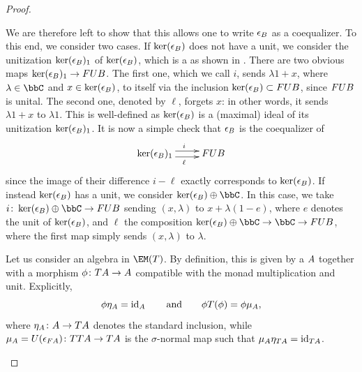 \begin{proof}
\begin{description}
		      We are therefore left to show that this allows one to write $\epsilon_{{B}}$ as a coequalizer. To this end, we consider two cases. If $\ker(\epsilon_{{B}})$ does not have a unit, we consider the unitization $\ker(\epsilon_{{B}})_1$ of $\ker(\epsilon_{{B}})$, which is a \cstars{} as shown in \cite[Proposition 2.2.10]{saito15monotone}.
		      There are two obvious maps $\ker(\epsilon_{{B}})_1 \to FU{B}$.
		      The first one, which we call $i$, sends $\lambda 1+x$, where $\lambda \in \bbC$ and $x\in \ker(\epsilon_{{B}})$, to itself via the inclusion $\ker(\epsilon_{{B}}) \subset FU{B} $, since $FU{B}$ is unital. The second one, denoted by $\ell$, forgets $x$: in other words, it sends $\lambda 1 +x$ to $\lambda 1$. This is well-defined as $\ker(\epsilon_{{B}})$ is a (maximal) ideal of its unitization $\ker(\epsilon_{{B}})_1$.
		      It is now a simple check that $\epsilon_{{B}}$ is the coequalizer of
		      \[
			      \xymatrix{
				      \ker(\epsilon_{\B})_1
				      \ar@<.7ex>[r]^{i}
				      \ar@<-.7ex>[r]_{\ell}
				      & FU\B
			      }
		      \]
		      since the image of their difference $i-\ell$ exactly corresponds to $\ker(\epsilon_{{B}})$.
		      If instead $\ker(\epsilon_{{B}})$ has a unit, we consider $\ker(\epsilon_{\B})\oplus \bbC$. In this case, we take $i\colon \ker(\epsilon_{\B})\oplus \bbC \to FU\B$ sending $(x,\lambda)$ to $x+\lambda (1-e)$, where $e$ denotes the unit of $\ker(\epsilon_{{B}})$, and $\ell$ the composition $\ker(\epsilon_{\B})\oplus \bbC \to \bbC\to FU\B$, where the first map simply sends $(x,\lambda)$ to $\lambda$.
		\item[{$K$ is essentially surjective}] Let us consider an algebra in $\EM(T)$. By definition, this is given by a \cstar{} ${A}$ together with a morphism $\phi\colon T{A}\to {A}$ compatible with the monad multiplication and unit.
		      Explicitly,
		      \begin{equation}\label{eq:EM_algebra}
			      \phi \eta_{{A}}=\operatorname{id}_{{A}}\qquad\text{and}\qquad\phi T(\phi)= \phi \mu_{{A}},
		      \end{equation}
		      where $\eta_{{A}}\colon {A} \to T{A}$ denotes the standard inclusion, while $\mu_{{A}}=U(\epsilon_{F{A}})\colon TT{A} \to T{A}$ is the $\sigma$-normal map such that $\mu_{{A}}\eta_{T{A}}=\operatorname{id}_{T{A}}$.


\end{description}
\end{proof}
